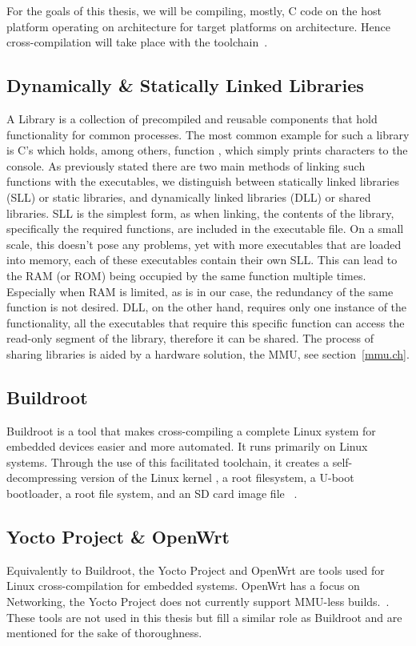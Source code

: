For the goals of this thesis, we will be compiling, mostly, C code on the host platform operating on  architecture for target platforms on  architecture. Hence cross-compilation will take place with the  toolchain~\cite{gcc-arm-none-eabi}.

\subsection{Dynamically \& Statically Linked Libraries}\label{dsll}
A Library is a collection of precompiled and reusable components that hold functionality for common processes. The most common example for such a library is C's  which holds, among others, function , which simply prints characters to the console. As previously stated there are two main methods of linking such functions with the executables, we distinguish between statically linked libraries (SLL) or static libraries, and dynamically linked libraries (DLL) or shared libraries. SLL is the simplest form, as when linking, the contents of the library, specifically the required functions, are included in the executable file. On a small scale, this doesn't pose any problems, yet with more executables that are loaded into memory, each of these executables contain their own SLL. This can lead to the RAM (or ROM) being occupied by the same function multiple times. Especially when RAM is limited, as is in our case, the redundancy of the same function is not desired. DLL, on the other hand, requires only one instance of the functionality, all the executables that require this specific function can access the read-only segment of the library, therefore it can be shared. The process of sharing libraries is aided by a hardware solution, the MMU, see section~\ref{mmu.ch}.

\subsection{Buildroot }\label{buildroot.ch}
Buildroot is a tool that makes cross-compiling a complete Linux system for embedded devices easier and more automated. It runs primarily on Linux systems. Through the use of this facilitated toolchain, it creates a self-decompressing version of the Linux kernel , a root filesystem, a U-boot bootloader, a root file system, and an SD card image file ~\cite {buildroot}.

\subsection{Yocto Project \& OpenWrt}
Equivalently to Buildroot, the Yocto Project and OpenWrt are tools used for Linux cross-compilation for embedded systems. OpenWrt has a focus on Networking, the Yocto Project does not currently support MMU-less builds.~\cite{openwrt, yocto}. These tools are not used in this thesis but fill a similar role as Buildroot and are mentioned for the sake of thoroughness. 

